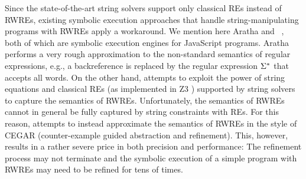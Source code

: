 Since the state-of-the-art string solvers support only classical REs instead of
RWREs, %
existing symbolic execution approaches that handle
string-manipulating programs with RWREs apply a workaround.
We mention here Aratha \cite{aratha} and \expose~\cite{LMK19}, both of which are
symbolic execution engines for JavaScript programs.
Aratha performs a very rough approximation to the 
non-standard semantics of regular expressions, e.g., a backreference
is replaced by the regular expression $\Sigma^*$ that accepts all words.
On the other hand, \expose{} attempts to exploit the power of string 
equations and classical REs (as implemented in Z3 \cite{Z3}) supported by string
solvers to capture the 
semantics of RWREs. Unfortunately, the semantics of RWREs cannot 
in general be fully captured by string constraints with REs. 
For this reason, 
\expose{} attempts to instead approximate the semantics of RWREs in the style of 
CEGAR (counter-example guided abstraction and refinement). This, however,
results in a rather severe price in both precision and performance: The refinement process may not terminate and the symbolic execution of a simple program with RWREs may need to be refined for tens of times. 





